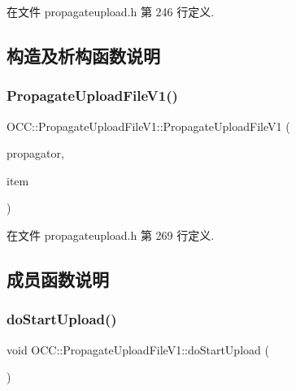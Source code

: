 在文件 propagateupload.\+h 第 246 行定义.



\subsection{构造及析构函数说明}
\mbox{\label{class_o_c_c_1_1_propagate_upload_file_v1_ae48f44222bd5157777610d85a17272fa}} 
\subsubsection{\texorpdfstring{Propagate\+Upload\+File\+V1()}{PropagateUploadFileV1()}}
{\footnotesize\ttfamily O\+C\+C\+::\+Propagate\+Upload\+File\+V1\+::\+Propagate\+Upload\+File\+V1 (\begin{DoxyParamCaption}\item[{\hyperlink{class_o_c_c_1_1_owncloud_propagator}{Owncloud\+Propagator} $\ast$}]{propagator,  }\item[{const \hyperlink{namespace_o_c_c_acb6b0db82893659fbd0c98d3c5b8e2b8}{Sync\+File\+Item\+Ptr} \&}]{item }\end{DoxyParamCaption})}



在文件 propagateupload.\+h 第 269 行定义.



\subsection{成员函数说明}
\mbox{\label{class_o_c_c_1_1_propagate_upload_file_v1_ae868275c2eda03e0e6f83b1e9b8b5e54}} 
\subsubsection{\texorpdfstring{do\+Start\+Upload()}{doStartUpload()}}
{\footnotesize\ttfamily void O\+C\+C\+::\+Propagate\+Upload\+File\+V1\+::do\+Start\+Upload (\begin{DoxyParamCaption}{ }\end{DoxyParamCaption})\hspace{0.3cm}{\ttfamily [virtual]}}



